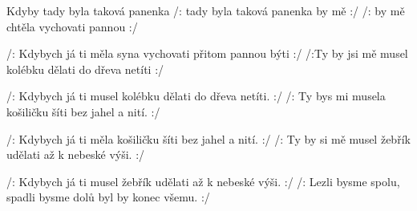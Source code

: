 \begin{TEXT}{Kdyby tady byla taková panenka}
\SLOKA /:  tady byla taková panenka\NL
{} by mě  :/\NL
/:  by mě chtěla  vychovati\NL
{} pannou  :/
                                  
\SLOKA /: Kdybych já ti měla syna vychovati\NL          
přitom pannou býti :/\NL
/:Ty by jsi mě musel kolébku dělati\NL
do dřeva netíti :/

\SLOKA /: Kdybych já ti musel kolébku dělati\NL
do dřeva netíti. :/\NL
/: Ty bys mi musela košiličku šíti\NL
bez jahel a nití. :/

\SLOKA /: Kdybych já ti měla košiličku šíti\NL
bez jahel a nití. :/\NL
/: Ty by si mě musel žebřík udělati\NL
až k nebeské výši. :/

\SLOKA /: Kdybych já ti musel žebřík udělati\NL
až k nebeské výši. :/\NL
/: Lezli bysme spolu, spadli bysme dolů\NL
byl by konec všemu. :/
\end{TEXT}